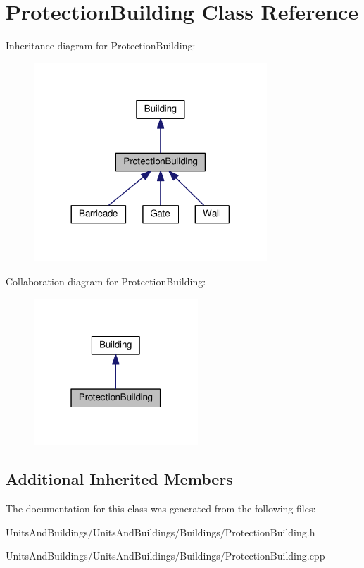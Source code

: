 \hypertarget{class_protection_building}{}\section{Protection\+Building Class Reference}
\label{class_protection_building}


Inheritance diagram for Protection\+Building\+:
\nopagebreak
\begin{figure}[H]
\begin{center}
\leavevmode
\includegraphics[width=248pt]{class_protection_building__inherit__graph}
\end{center}
\end{figure}


Collaboration diagram for Protection\+Building\+:
\nopagebreak
\begin{figure}[H]
\begin{center}
\leavevmode
\includegraphics[width=175pt]{class_protection_building__coll__graph}
\end{center}
\end{figure}
\subsection*{Additional Inherited Members}


The documentation for this class was generated from the following files\+:\begin{DoxyCompactItemize}
\item 
Units\+And\+Buildings/\+Units\+And\+Buildings/\+Buildings/Protection\+Building.\+h\item 
Units\+And\+Buildings/\+Units\+And\+Buildings/\+Buildings/Protection\+Building.\+cpp\end{DoxyCompactItemize}
